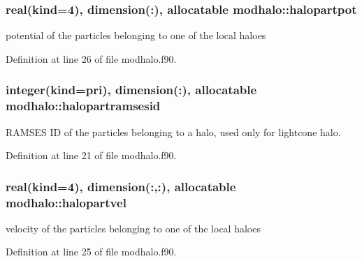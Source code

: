 \subsubsection[{\texorpdfstring{halopartpot}{halopartpot}}]{\setlength{\rightskip}{0pt plus 5cm}real(kind=4), dimension(\+:), allocatable modhalo\+::halopartpot}\hypertarget{namespacemodhalo_ae632dc8638ef825d9db5997b21fd3b63}{}\label{namespacemodhalo_ae632dc8638ef825d9db5997b21fd3b63}


potential of the particles belonging to one of the local haloes 



Definition at line 26 of file modhalo.\+f90.

\subsubsection[{\texorpdfstring{halopartramsesid}{halopartramsesid}}]{\setlength{\rightskip}{0pt plus 5cm}integer(kind=pri), dimension(\+:), allocatable modhalo\+::halopartramsesid}\hypertarget{namespacemodhalo_a5b68c60e3d37130087e8314a89f8f880}{}\label{namespacemodhalo_a5b68c60e3d37130087e8314a89f8f880}


R\+A\+M\+S\+ES ID of the particles belonging to a halo, used only for lightcone halo. 



Definition at line 21 of file modhalo.\+f90.

\subsubsection[{\texorpdfstring{halopartvel}{halopartvel}}]{\setlength{\rightskip}{0pt plus 5cm}real(kind=4), dimension(\+:,\+:), allocatable modhalo\+::halopartvel}\hypertarget{namespacemodhalo_a9d88ee4555aab3eb3cc4626800de250b}{}\label{namespacemodhalo_a9d88ee4555aab3eb3cc4626800de250b}


velocity of the particles belonging to one of the local haloes 



Definition at line 25 of file modhalo.\+f90.

